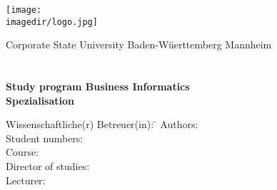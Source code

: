 \begin{titlepage}
\begin{minipage}{\textwidth}
		\vspace{-2cm}
		
		 \texttt{[image: \\imagedir/logo.jpg]}
\end{minipage}
\vspace{1em}
\begin{center}
	{\textsf{\large Corporate State University Baden-W\"uerttemberg Mannheim}}\\[4em]
	{\textsf{\textbf{\large{\DieArtDerArbeit}}}}\\[6mm]
	{\textsf{\textbf{\Large{}\DerTitelDerArbeit}}} \\[1.5cm]
	{\textsf{\textbf{\large{}Study program Business Informatics}}\\[6mm]
	\textsf{\textbf{Spezialisation \DieStudienrichtung}}}\vspace{15em}
	
	\begin{minipage}{\textwidth}
		\begin{tabbing}
		Wissenschaftliche(r) Betreuer(in): \hspace{0.85cm}\=\kill
		Authors: \> \DerAutorDerArbeit \\[1.5mm]
		Student numbers: \> \DieMatrikelnummer \\[1.5mm]
		Course: \> \DieKursbezeichnung \\[1.5mm]
		Director of studies: \> \DerStudiengangsleiter \\[1.5mm]
		Lecturer: \> \DerWissBetreuer \\[1.5mm]
		\end{tabbing}
	\end{minipage}
\end{center}
\end{titlepage}